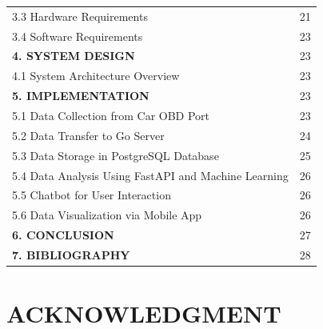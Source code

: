 \documentclass[12pt,a4paper]{report}
\begin{document}
\begin{tabular}{ll}
    \hspace{0.5cm} 3.3 Hardware Requirements & \hspace{0.8cm}21 \\
    \hspace{0.5cm} 3.4 Software Requirements & \hspace{0.8cm}23 \\[0.5cm]
    \textbf{4. SYSTEM DESIGN} & \hspace{0.8cm}23 \\
    \hspace{0.5cm} 4.1 System Architecture Overview & \hspace{0.8cm}23 \\[0.5cm]
    \textbf{5. IMPLEMENTATION} & \hspace{0.8cm}23 \\
    \hspace{0.5cm} 5.1 Data Collection from Car OBD Port & \hspace{0.8cm}23 \\
    \hspace{0.5cm} 5.2 Data Transfer to Go Server & \hspace{0.8cm}24 \\
    \hspace{0.5cm} 5.3 Data Storage in PostgreSQL Database & \hspace{0.8cm}25 \\
    \hspace{0.5cm} 5.4 Data Analysis Using FastAPI and Machine Learning & \hspace{0.8cm}26 \\
    \hspace{0.5cm} 5.5 Chatbot for User Interaction & \hspace{0.8cm}26 \\
    \hspace{0.5cm} 5.6 Data Visualization via Mobile App & \hspace{0.8cm}26 \\[0.5cm]
    \textbf{6. CONCLUSION} & \hspace{0.8cm}27 \\
    \textbf{7. BIBLIOGRAPHY} & \hspace{0.8cm}28 \\
\end{tabular}

\newpage
{} %
\setcounter{page}{1} %
\section{ACKNOWLEDGMENT}
\end{document}
